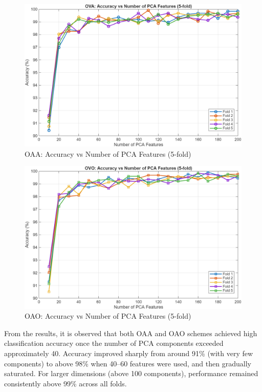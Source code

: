 \documentclass[12pt,a4paper]{article}
\begin{document}
\begin{multicols}{2}
\begin{figure}[H]
    \centering
    \includegraphics[width=1\linewidth]{Diagrams/res1.png}
    \caption{OAA: Accuracy vs Number of PCA Features (5-fold)}
    \label{fig:OAA_results}
\end{figure}

\begin{figure}[H]
    \centering
    \includegraphics[width=1\linewidth]{Diagrams/res2.png}
    \caption{OAO: Accuracy vs Number of PCA Features (5-fold)}
    \label{fig:OAO_results}
\end{figure}

From the results, it is observed that both OAA and OAO schemes achieved high 
classification accuracy once the number of PCA components exceeded 
approximately 40. Accuracy improved sharply from around 91\% (with very few 
components) to above 98\% when 40--60 features were used, and then gradually 
saturated. For larger dimensions (above 100 components), performance remained 
consistently above 99\% across all folds.  


\end{multicols}
\end{document}

